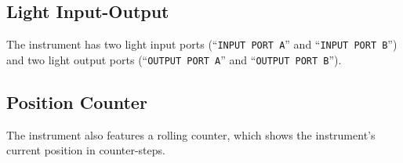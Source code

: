 \documentclass{article}
\begin{document}
\subsection{Light Input-Output}

The instrument has two light input ports (``\verb|INPUT PORT A|'' and ``\verb|INPUT PORT B|'') and two light output ports (``\verb|OUTPUT PORT A|'' and ``\verb|OUTPUT PORT B|'').

\subsection{Position Counter}

The instrument also features a rolling counter, which shows the instrument's current position in counter-steps.
\end{document}
